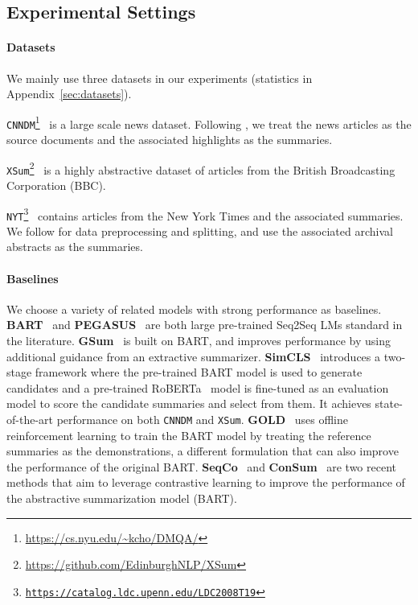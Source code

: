\documentclass[11pt]{article}
\begin{document}
\subsection{Experimental Settings}



\paragraph{Datasets} We mainly use three datasets in our experiments (statistics in Appendix~\ref{sec:datasets}).

\noindent\texttt{CNNDM}\footnote{\url{https://cs.nyu.edu/~kcho/DMQA/}}~\citep{10.5555/2969239.2969428} is a large scale news dataset.
Following \citet{nallapati-etal-2016-abstractive}, we treat the news articles as the source documents and the associated highlights as the summaries.

\noindent\texttt{XSum}\footnote{\url{https://github.com/EdinburghNLP/XSum}}~\citep{narayan-etal-2018-dont} is a highly abstractive dataset of articles from the British Broadcasting Corporation (BBC).

\noindent\texttt{NYT\footnote{\url{https://catalog.ldc.upenn.edu/LDC2008T19}}}~\citep{linguistic2008new}
contains articles from the New York Times and the associated summaries.
We follow \citet{kedzie-etal-2018-content} for data preprocessing and splitting, and use the associated archival abstracts as the summaries. 


\paragraph{Baselines}

We choose a variety of related models with strong performance as baselines.
\noindent \textbf{BART}~\citep{lewis-etal-2020-bart} and \textbf{PEGASUS}~\citep{zhang2020pegasus} are both large pre-trained Seq2Seq LMs standard in the literature.
\textbf{GSum}~\citep{dou-etal-2021-gsum} is built on BART, and improves performance by using additional guidance from an extractive summarizer.
\textbf{SimCLS}~\citep{liu-liu-2021-simcls} introduces a two-stage framework where the pre-trained BART model is used to generate candidates and a pre-trained RoBERTa~\citep{DBLP:journals/corr/abs-1907-11692} model is fine-tuned as an evaluation model to score the candidate summaries and select from them. It achieves state-of-the-art performance on both \texttt{CNNDM} and \texttt{XSum}.
\textbf{GOLD}~\citep{pang2021text} uses offline reinforcement learning to train the BART model by treating the reference summaries as the demonstrations, a different formulation that can also improve the performance of the original BART.
\textbf{SeqCo}~\citep{DBLP:journals/corr/abs-2109-03481} and \textbf{ConSum}~\citep{DBLP:journals/corr/abs-2108-11846} are two recent methods that aim to leverage contrastive learning to improve the performance of the abstractive summarization model (BART). 
\end{document}

